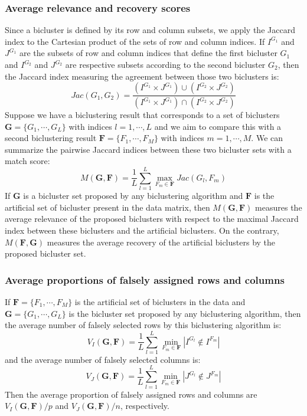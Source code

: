\subsubsection{Average relevance and recovery scores}
Since a bicluster is defined by its row and column subsets, we apply the Jaccard index to the Cartesian product of the sets of row and column indices.
If $I^{G_{1}}$ and $J^{G_{1}}$ are the subsets of row and column indices that define the first bicluster $G_{1}$ and $I^{G_{2}}$ and $J^{G_{2}}$ are respective subsets according to the second bicluster $G_{2}$, then the Jaccard index measuring the agreement between those two biclusters is:
\[
Jac(G_{1},G_{2}) = \frac{( I^{G_{1}} \times J^{G_{1}}) \cup (I^{G_{2}}\times J^{G_{2}}) }{ (I^{G_{1}} \times J^{G_{1}}) \cap (I^{G_{2}} \times J^{G_{2}}) }
\]
Suppose we have a biclustering result that corresponds to a set of biclusters $\mathbf{G}=\{G_{1},\cdots,G_{L}\}$ with indices $l=1,\cdots,L$ and we aim to compare this with a second biclustering result $\mathbf{F}=\{F_{1},\cdots,F_{M}\}$ with indices $m=1,\cdots,M$. We can summarize the pairwise Jaccard indices between these two bicluster sets with a match score:
\begin{equation} 
M(\mathbf{G},\mathbf{F}) = \frac{1}{L} \sum_{l=1}^{L} \max_{F_{m} \in \mathbf{F}}  Jac(G_{l},F_{m})
\end{equation}
If $\mathbf{G}$ is a bicluster set proposed by any biclustering algorithm and $\mathbf{F}$ is the artificial set of bicluster present in the data matrix, then $M(\mathbf{G},\mathbf{F})$ measures the average relevance of the proposed biclusters with respect to the maximal Jaccard index between these biclusters and the artificial biclusters. On the contrary, $M(\mathbf{F},\mathbf{G})$ measures the average recovery of the artificial biclusters by the proposed bicluster set. 

\subsubsection{Average proportions of falsely assigned rows and columns}
If $\mathbf{F}=\{F_{1},\cdots,F_{M}\}$ is the artificial set of biclusters in the data and $\mathbf{G}=\{G_{1},\cdots,G_{L}\}$ is the bicluster set proposed by any biclustering algorithm, then the average number of falsely selected rows by this biclustering algorithm is:
\begin{equation}
V_{I}(\mathbf{G},\mathbf{F}) = \frac{1}{L} \sum_{l=1}^{L} \min_{F_{m} \in \mathbf{F}} |I^{G_{l}} \notin I^{F_{m}}|
\end{equation}
and the average number of falsely selected columns is:
\begin{equation}
V_{J}(\mathbf{G},\mathbf{F}) = \frac{1}{L} \sum_{l=1}^{L} \min_{F_{m} \in \mathbf{F}} |J^{G_{l}} \notin J^{F_{m}}|
\end{equation}
Then the average proportion of falsely assigned rows and columns are $V_{I}(\mathbf{G},\mathbf{F})/p$ and $V_{J}(\mathbf{G},\mathbf{F})/n$, respectively.

